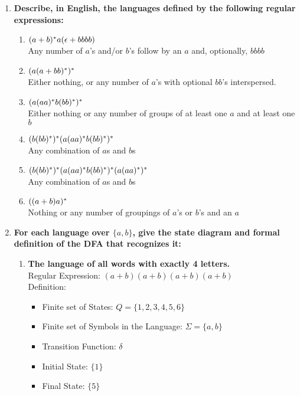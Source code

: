 \begin{enumerate}
\newpage
\item \textbf{Describe, in English, the languages defined by the following regular expressions:}
\begin{enumerate}
  \item $(a+b){}^\ast a(\epsilon+bbbb)$
  \\ Any  number of $a$'s and/or $b$'s follow by an $a$ and, optionally, $bbbb$
  \item $(a(a+bb){}^\ast){}^\ast$
  \\ Either nothing, or any number of $a$'s with optional $bb$'s interspersed.
  \item $(a(aa){}^\ast b(bb){}^\ast){}^\ast$
  \\ Either nothing or any number of groups of at least one $a$ and at least one $b$
  \item $(b(bb){}^\ast){}^\ast(a(aa){}^\ast b(bb){}^\ast){}^\ast$
  \\  Any combination of $a$s and $b$s
  \item $(b(bb){}^\ast){}^\ast(a(aa){}^\ast b(bb){}^\ast){}^\ast(a(aa){}^\ast){}^\ast$
  \\  Any combination of $a$s and $b$s
  \item $((a+b)a){}^\ast$
  \\ Nothing or any number of groupings of $a$'s or $b$'s and an $a$
\end{enumerate}

\newpage
\item \textbf{For each language over $\{a,b\}$, give the state diagram and formal definition of the DFA that recognizes it:}
\begin{enumerate}
  \item \textbf{The language of all words with exactly 4 letters.}
  \\
          Regular Expression: $(a+b)(a+b)(a+b)(a+b)$
  \\
  Definition: 
  \begin{itemize}
  	\item Finite set of States: $Q = \{1,2,3,4,5, 6\}$
  	  	\item Finite set of Symbols in the Language: $\Sigma = \{a,b\}$
  	  	  	\item Transition Function: $\delta$
  	  	  	  	\item Initial State: $\{1\}$
   	  	  	  	\item Final State: $\{5\}$
  \end{itemize}
  

\end{enumerate}
\end{enumerate}
